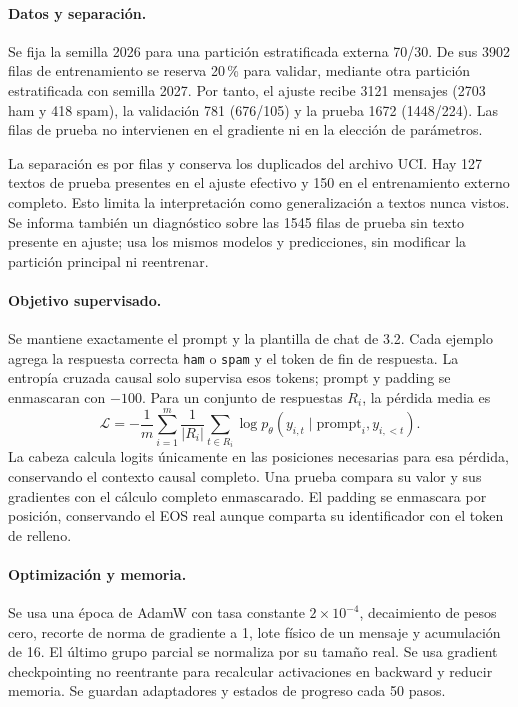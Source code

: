 \paragraph{Datos y separación.} Se fija la semilla 2026 para una partición
estratificada externa 70/30. De sus 3902 filas de entrenamiento se reserva
20\,\% para validar, mediante otra partición estratificada con semilla
2027. Por tanto, el ajuste recibe 3121 mensajes (2703 ham y 418 spam),
la validación 781 (676/105) y la prueba 1672 (1448/224). Las filas de
prueba no intervienen en el gradiente ni en la elección de parámetros.

La separación es por filas y conserva los duplicados del archivo UCI.
Hay 127 textos de prueba presentes en el ajuste efectivo y 150 en el
entrenamiento externo completo. Esto limita la interpretación como
generalización a textos nunca vistos. Se informa también un diagnóstico
sobre las 1545 filas de prueba sin texto presente en ajuste; usa los mismos
modelos y predicciones, sin modificar la partición principal ni reentrenar.

\paragraph{Objetivo supervisado.} Se mantiene exactamente el prompt y la
plantilla de chat de 3.2. Cada ejemplo agrega la respuesta correcta
\texttt{ham} o \texttt{spam} y el token de fin de respuesta. La entropía
cruzada causal solo supervisa esos tokens; prompt y padding se enmascaran
con $-100$. Para un conjunto de respuestas $R_i$, la pérdida media es
\[
 \mathcal{L}=-\frac{1}{m}\sum_{i=1}^{m}\frac{1}{|R_i|}
       \sum_{t\in R_i}\log p_\theta(y_{i,t}\mid\text{prompt}_i,y_{i,<t}).
\]
La cabeza calcula logits únicamente en las posiciones necesarias para
esa pérdida, conservando el contexto causal completo. Una prueba compara
su valor y sus gradientes con el cálculo completo enmascarado. El padding
se enmascara por posición, conservando el EOS real aunque comparta su
identificador con el token de relleno.

\paragraph{Optimización y memoria.} Se usa una época de AdamW con
tasa constante $2\times10^{-4}$, decaimiento de pesos cero, recorte de norma
de gradiente a 1, lote físico de un mensaje y acumulación de 16. El último
grupo parcial se normaliza por su tamaño real. Se usa gradient
checkpointing no reentrante para recalcular activaciones en backward y
reducir memoria. Se guardan adaptadores y estados de progreso cada 50
pasos.


